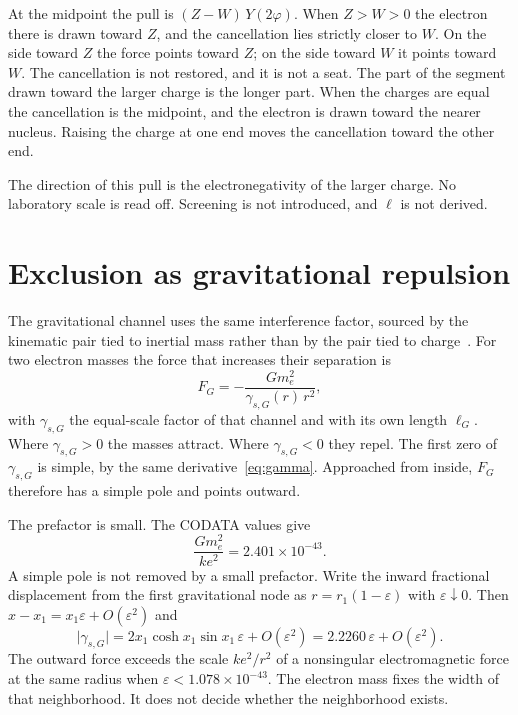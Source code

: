\documentclass[a4paper]{article}
\begin{document}
At the midpoint the pull is \((Z-W)\,Y(2\varphi)\). When \(Z>W>0\) the electron there is drawn toward \(Z\), and the cancellation lies strictly closer to \(W\). On the side toward \(Z\) the force points toward \(Z\); on the side toward \(W\) it points toward \(W\). The cancellation is not restored, and it is not a seat. The part of the segment drawn toward the larger charge is the longer part. When the charges are equal the cancellation is the midpoint, and the electron is drawn toward the nearer nucleus. Raising the charge at one end moves the cancellation toward the other end.

The direction of this pull is the electronegativity of the larger charge. No laboratory scale is read off. Screening is not introduced, and \(\ell\) is not derived.

\section{Exclusion as gravitational repulsion}
\label{sec:pauli}

The gravitational channel uses the same interference factor, sourced by the kinematic pair tied to inertial mass rather than by the pair tied to charge~\cite{dst-main}. For two electron masses the force that increases their separation is
\begin{equation}
\label{eq:grav}
F_G=-\frac{G m_e^{2}}{\gamma_{s,G}(r)\,r^{2}},
\end{equation}
with \(\gamma_{s,G}\) the equal-scale factor of that channel and with its own length \(\ell_G\). Where \(\gamma_{s,G}>0\) the masses attract. Where \(\gamma_{s,G}<0\) they repel. The first zero of \(\gamma_{s,G}\) is simple, by the same derivative~\eqref{eq:gamma}. Approached from inside, \(F_G\) therefore has a simple pole and points outward.

The prefactor is small. The CODATA values give
\begin{equation}
\label{eq:ratioG}
\frac{G m_e^{2}}{k e^{2}}=2.401\times 10^{-43}.
\end{equation}
A simple pole is not removed by a small prefactor. Write the inward fractional displacement from the first gravitational node as \(r=r_1(1-\varepsilon)\) with \(\varepsilon\downarrow 0\). Then \(x-x_1=x_1\varepsilon+O(\varepsilon^{2})\) and
\[
\bigl|\gamma_{s,G}\bigr|
  =2x_1\cosh x_1\sin x_1\,\varepsilon+O(\varepsilon^{2})
  =2.2260\,\varepsilon+O(\varepsilon^{2}).
\]
The outward force exceeds the scale \(k e^{2}/r^{2}\) of a nonsingular electromagnetic force at the same radius when \(\varepsilon<1.078\times 10^{-43}\). The electron mass fixes the width of that neighborhood. It does not decide whether the neighborhood exists.
\end{document}
